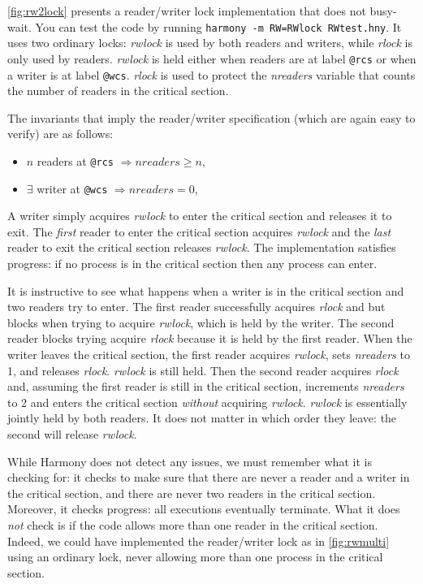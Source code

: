 \documentclass{report}
\begin{document}
\autoref{fig:rw2lock} presents a reader/writer lock implementation
that does not busy-wait.
You can test the code by running \texttt{harmony -m RW=RWlock RWtest.hny}.
It uses two ordinary locks: \textit{rwlock} is used by both readers and writers,
while \textit{rlock} is only used by readers.
\textit{rwlock} is held either when readers are at label \texttt{@rcs}
or when a writer is at label \texttt{@wcs}.
\textit{rlock} is used to protect the \textit{nreaders} variable that
counts the number of readers in the critical section. 

The invariants that imply the reader/writer specification
(which are again easy to verify) are as follows:

\begin{itemize}
\item $n$ readers at \texttt{@rcs} $\Rightarrow \mathit{nreaders} \ge n$,
\item $\exists$ writer at \texttt{@wcs} $\Rightarrow \mathit{nreaders} = 0$,
\end{itemize}

A writer simply acquires \textit{rwlock} to enter the critical section
and releases it to exit.  The \emph{first} reader to enter the critical
section acquires \textit{rwlock} and the \emph{last} reader to exit
the critical section releases \textit{rwlock}.
The implementation satisfies progress: if no process is in the critical
section then any process can enter.

It is instructive to see what happens when a writer is in the critical
section and two readers try to enter.  The first reader successfully
acquires \textit{rlock} and but blocks when trying to acquire
\textit{rwlock}, which is held by the writer.  The second reader blocks
trying acquire \textit{rlock} because it is held by the first reader.
When the writer leaves the critical section, the first reader acquires
\textit{rwlock}, sets \textit{nreaders} to 1, and releases \textit{rlock}.
\textit{rwlock} is still held.
Then the second reader acquires \textit{rlock} and, assuming the first
reader is still in the critical section, increments \textit{nreaders} to 2
and enters the critical section \emph{without} acquiring \textit{rwlock}.
\textit{rwlock} is essentially jointly held by both readers.
It does not matter in which order they leave: the second will release
\textit{rwlock}.

While Harmony does not detect any issues, we must remember what it is checking
for: it checks to make sure that there are never a reader and a writer
in the critical section, and there are never two readers in the critical
section.  Moreover, it checks progress: all executions eventually terminate.
What it does \emph{not} check is if the code allows more than one reader
in the critical section.  Indeed, we could have implemented the reader/writer
lock as in \autoref{fig:rwmulti} using an ordinary lock, never allowing
more than one process in the critical section.
\end{document}

